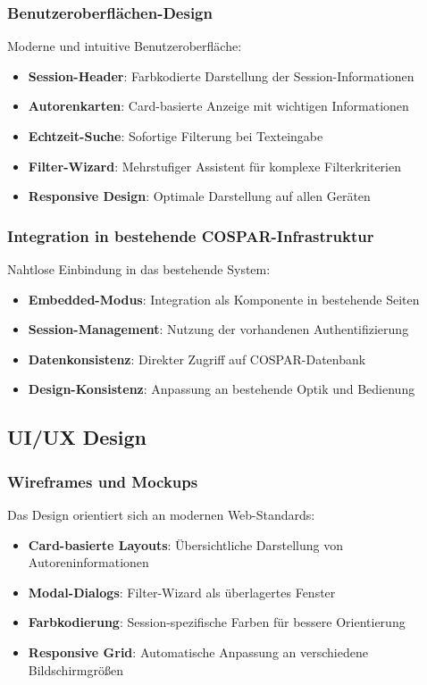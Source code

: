\documentclass[11pt,a4paper]{article}
\begin{document}
\subsubsection{Benutzeroberflächen-Design}
Moderne und intuitive Benutzeroberfläche:
\begin{itemize}
    \item \textbf{Session-Header}: Farbkodierte Darstellung der Session-Informationen
    \item \textbf{Autorenkarten}: Card-basierte Anzeige mit wichtigen Informationen
    \item \textbf{Echtzeit-Suche}: Sofortige Filterung bei Texteingabe
    \item \textbf{Filter-Wizard}: Mehrstufiger Assistent für komplexe Filterkriterien
    \item \textbf{Responsive Design}: Optimale Darstellung auf allen Geräten
\end{itemize}

\subsubsection{Integration in bestehende COSPAR-Infrastruktur}
Nahtlose Einbindung in das bestehende System:
\begin{itemize}
    \item \textbf{Embedded-Modus}: Integration als Komponente in bestehende Seiten
    \item \textbf{Session-Management}: Nutzung der vorhandenen Authentifizierung
    \item \textbf{Datenkonsistenz}: Direkter Zugriff auf COSPAR-Datenbank
    \item \textbf{Design-Konsistenz}: Anpassung an bestehende Optik und Bedienung
\end{itemize}

\subsection{UI/UX Design}

\subsubsection{Wireframes und Mockups}
Das Design orientiert sich an modernen Web-Standards:
\begin{itemize}
    \item \textbf{Card-basierte Layouts}: Übersichtliche Darstellung von Autoreninformationen
    \item \textbf{Modal-Dialogs}: Filter-Wizard als überlagertes Fenster
    \item \textbf{Farbkodierung}: Session-spezifische Farben für bessere Orientierung
    \item \textbf{Responsive Grid}: Automatische Anpassung an verschiedene Bildschirmgrößen
\end{itemize}
\end{document}
